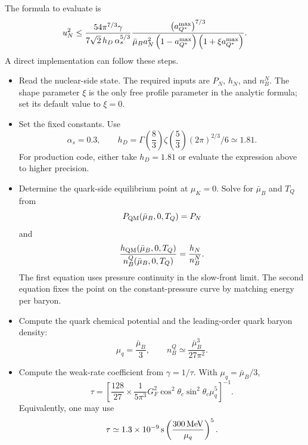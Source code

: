 \documentclass[11pt]{article}
\begin{document}
The formula to evaluate is
\begin{equation}
u_N^2
\le
\frac{
54\pi^{7/3}\gamma
}{
7\sqrt{2}\,h_D\,\alpha_s^{5/3}
}
\frac{
\left(a_{Q^*}^{\rm max}\right)^{7/3}
}{
\bar\mu_B a_N^2
\left(1-a_{Q^*}^{\rm max}\right)
\left(1+\xi a_{Q^*}^{\rm max}\right)
}.
\end{equation}
A direct implementation can follow these steps.
\begin{itemize}
\item Read the nuclear-side state. The required inputs are \(P_N\), \(h_N\),
and \(n_B^N\). The shape parameter \(\xi\) is the only free profile parameter
in the analytic formula; set its default value to \(\xi=0\).
\item Set the fixed constants. Use
\begin{equation}
\alpha_s=0.3,
\qquad
h_D=
\Gamma\!\left(\frac{8}{3}\right)
\zeta\!\left(\frac{5}{3}\right)
(2\pi)^{2/3}/6
\simeq1.81.
\end{equation}
For production code, either take \(h_D=1.81\) or evaluate the expression above
to higher precision.
\item Determine the quark-side equilibrium point at \(\mu_K=0\). Solve for
\(\bar\mu_B\) and \(T_Q\) from
\begin{equation}
P_{\rm QM}(\bar\mu_B,0,T_Q)=P_N
\end{equation}
and
\begin{equation}
\frac{h_{\rm QM}(\bar\mu_B,0,T_Q)}
{n_B^Q(\bar\mu_B,0,T_Q)}
=
\frac{h_N}{n_B^N}.
\end{equation}
The first equation uses pressure continuity in the slow-front limit. The second
equation fixes the point on the constant-pressure curve by matching energy per
baryon.
\item Compute the quark chemical potential and the leading-order quark baryon
density:
\begin{equation}
\mu_q=\frac{\bar\mu_B}{3},
\qquad
n_B^Q\simeq\frac{\bar\mu_B^3}{27\pi^2}.
\end{equation}
\item Compute the weak-rate coefficient from \(\gamma=1/\tau\). With
\(\mu_q=\bar\mu_B/3\),
\begin{equation}
\tau
=
\left[
\frac{128}{27}
\times
\frac{1}{5\pi^3}
G_F^2
\cos^2\theta_c
\sin^2\theta_c
\mu_q^5
\right]^{-1}.
\end{equation}
Equivalently, one may use
\begin{equation}
\tau
\simeq
1.3\times10^{-9}\,{\rm s}
\left(\frac{300\,{\rm MeV}}{\mu_q}\right)^5 .

\end{equation}
\end{itemize}
\end{document}
